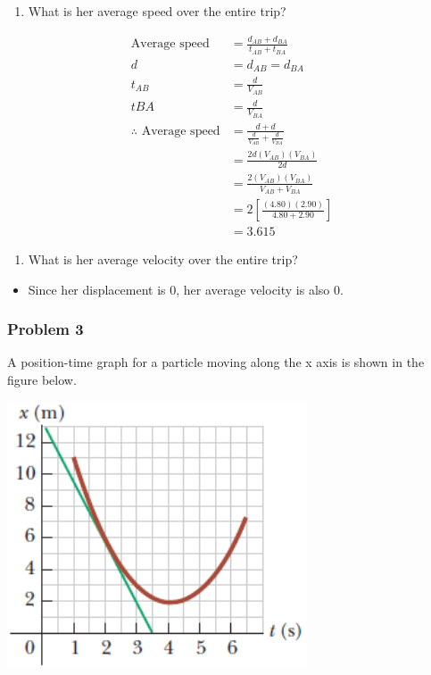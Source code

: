 \documentclass[
  letterpaper,
  DIV=11,
  numbers=noendperiod]{scrartcl}
\providecommand{\tightlist}{%
  \setlength{\itemsep}{0pt}\setlength{\parskip}{0pt}}\usepackage{longtable,booktabs,array}
\begin{document}
\begin{enumerate}
\def\labelenumi{(\alph{enumi})}
\tightlist
\item
  What is her average speed over the entire trip?
\end{enumerate}

\begin{align*}
\text{Average speed} &= \frac{d_{AB}+d_{BA}}{t_{AB}+t_{BA}} \\
d &= d_{AB} = d_{BA} \\
t_{AB} &= \frac{d}{V_{AB}} \\
t{BA} &= \frac{d}{V_{BA}} \\
\therefore \text{ Average speed} &= \frac{d+d}{\frac{d}{V_{AB}}+\frac{d}{V_{BA}}} \\
&= \frac{2d(V_{AB})(V_{BA})}{2d} \\
&= \frac{2(V_{AB})(V_{BA})}{V_{AB}+V_{BA}} \\
&= 2\left[\frac{(4.80)(2.90)}{4.80+2.90}\right] \\
&= 3.615
\end{align*}

\begin{enumerate}
\def\labelenumi{(\alph{enumi})}
\setcounter{enumi}{1}
\tightlist
\item
  What is her average velocity over the entire trip?
\end{enumerate}

\begin{itemize}
\tightlist
\item
  Since her displacement is 0, her average velocity is also 0.
\end{itemize}

\newpage{}

\hypertarget{problem-3}{%
\subsubsection{Problem 3}\label{problem-3}}

A position-time graph for a particle moving along the x axis is shown in
the figure below.

\includegraphics{img/Kinematics Velocity and Position HW/problem3.png}
\end{document}
